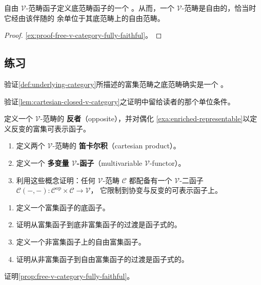 \begin{proposition}\label{prop:free-v-category-fully-faithful}
自由 $\mathcal{V}$-范畴函子定义底范畴函子的一个\trFullyFaithful{}
\trLeftAdjoint。从而，一个 $\mathcal{V}$-范畴是自由的，恰当时它经由该伴随的
余单位\trIsomorphism{}于其底范畴上的自由范畴。
\end{proposition}

\begin{proof}
\cref{ex:proof-free-v-category-fully-faithful}。
\end{proof}

\subsection*{练习}

\begin{exercise}\label{ex:underlying-category-is-category}
验证\cref{def:underlying-category}所描述的富集范畴之底范畴确实是一个%
\trCategory。
\end{exercise}

\begin{exercise}\label{ex:unit-condition}
验证\cref{lem:cartesian-closed-v-category}之证明中留给读者的那个单位条件。
\end{exercise}

\begin{exercise}\label{ex:opposite-v-category}
定义一个 $\mathcal{V}$-范畴的 \textbf{反者}（opposite），并对偶化%
\cref{exa:enriched-representable}以定义反变的富集可表示函子。
\end{exercise}

\begin{exercise}\label{ex:v-bifunctor}
\begin{enumerate}[label=(\roman*)]
\item 定义两个 $\mathcal{V}$-范畴的 \textbf{笛卡尔积}（cartesian product）。
\item 定义一个 \textbf{多变量 $\mathcal{V}$-函子}（multivariable
  $\mathcal{V}$-functor）。
\item 利用这些概念证明：任何 $\mathcal{V}$-范畴 $\mathcal{C}$ 都配备有一个%
  \trCanonical{} $\mathcal{V}$-二函子
  $\mathcal{C}(-,-)\colon\allowbreak\mathcal{C}^{\mathrm{op}}\times\allowbreak\mathcal{C}\to\allowbreak\mathcal{V}$，
  它限制到协变与反变的可表示函子上。
\end{enumerate}
\end{exercise}

\begin{exercise}\label{ex:underlying-free-functorial}
\begin{enumerate}[label=(\roman*)]
\item 定义一个富集函子的底函子。
\item 证明从富集函子到底非富集函子的过渡是函子式的。
\item 定义一个非富集函子上的自由富集函子。
\item 证明从非富集函子到自由富集函子的过渡是函子式的。
\end{enumerate}
\end{exercise}

\begin{exercise}[A.7.6]\label{ex:proof-free-v-category-fully-faithful}
证明\cref{prop:free-v-category-fully-faithful}。
\end{exercise}

